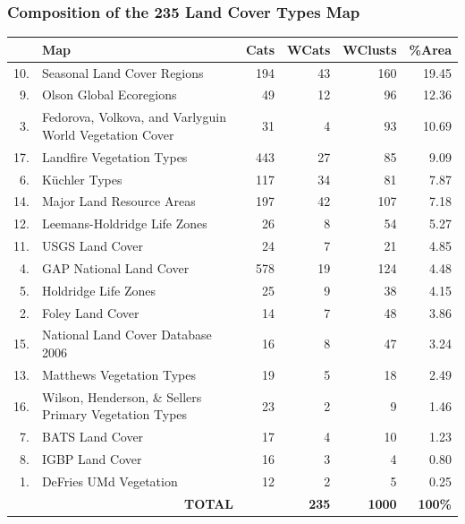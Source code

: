 \begin{frame}
 \frametitle{Composition of the 235 Land Cover Types Map}
 \scriptsize
 \setlength{\tabcolsep}{3pt}
 \begin{tabular}{|r>{\raggedright}p{5cm}|r|r|r|r|}
 \hline
  \textbf{} & \textbf{Map} & \textbf{Cats} & \textbf{WCats} &
  \textbf{WClusts} & \textbf{\%Area}\\ \hline
  10. & Seasonal Land Cover Regions & 194 & 43 & 160 & 19.45 \\ \hline
  9. & Olson Global Ecoregions & 49 & 12 & 96 & 12.36 \\ \hline
  3. & Fedorova, Volkova, and Varlyguin World Vegetation Cover & 31 & 4 &
  93 & 10.69 \\ \hline
  17. & Landfire Vegetation Types & 443 & 27 & 85 & 9.09 \\ \hline
  6. & K\"{u}chler Types & 117 & 34 & 81 & 7.87 \\ \hline
  14. & Major Land Resource Areas & 197 & 42 & 107 & 7.18 \\ \hline
  12. & Leemans-Holdridge Life Zones & 26 & 8 & 54 & 5.27 \\ \hline
  11. & USGS Land Cover & 24 & 7 & 21 & 4.85 \\ \hline
  4. & GAP National Land Cover & 578 & 19 & 124 & 4.48 \\ \hline
  5. & Holdridge Life Zones & 25 & 9 & 38 & 4.15 \\ \hline
  2. & Foley Land Cover & 14 & 7 & 48 & 3.86 \\ \hline
  15. & National Land Cover Database 2006 & 16 & 8 & 47 & 3.24 \\ \hline
  13. & Matthews Vegetation Types & 19 & 5 & 18 & 2.49 \\ \hline
  16. & Wilson, Henderson, \& Sellers Primary Vegetation Types & 23 & 2 & 9
  & 1.46 \\ \hline
  7. & BATS Land Cover & 17 & 4 & 10 & 1.23 \\ \hline
  8. & IGBP Land Cover & 16 & 3 & 4 & 0.80 \\ \hline
  1. & DeFries UMd Vegetation & 12 & 2 & 5 & 0.25 \\ \hline
  \hline
  \multicolumn{2}{|r|}{\textbf{TOTAL}} &     & \textbf{235} & \textbf{1000} & \textbf{100\%} \\ \hline
 \end{tabular}
\end{frame}


